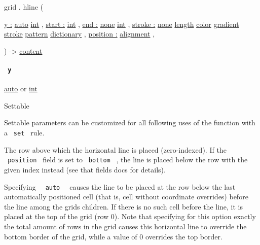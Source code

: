 grid { . } { hline } (

{ \hyperref[definitions-hline-parameters-y]{y :}
\href{/docs/reference/foundations/auto/}{auto}
\href{/docs/reference/foundations/int/}{int} , } {
\hyperref[definitions-hline-parameters-start]{start :}
\href{/docs/reference/foundations/int/}{int} , } {
\hyperref[definitions-hline-parameters-end]{end :}
\href{/docs/reference/foundations/none/}{none}
\href{/docs/reference/foundations/int/}{int} , } {
\hyperref[definitions-hline-parameters-stroke]{stroke :}
\href{/docs/reference/foundations/none/}{none}
\href{/docs/reference/layout/length/}{length}
\href{/docs/reference/visualize/color/}{color}
\href{/docs/reference/visualize/gradient/}{gradient}
\href{/docs/reference/visualize/stroke/}{stroke}
\href{/docs/reference/visualize/pattern/}{pattern}
\href{/docs/reference/foundations/dictionary/}{dictionary} , } {
\hyperref[definitions-hline-parameters-position]{position :}
\href{/docs/reference/layout/alignment/}{alignment} , }

) -\textgreater{} \href{/docs/reference/foundations/content/}{content}

\paragraph{\texorpdfstring{\texttt{\ y\ }}{ y }}\label{definitions-hline-y}

\href{/docs/reference/foundations/auto/}{auto} {or}
\href{/docs/reference/foundations/int/}{int}

{{ Settable }}

\label{definitions-hline-y-settable-tooltip}
Settable parameters can be customized for all following uses of the
function with a \texttt{\ set\ } rule.

The row above which the horizontal line is placed (zero-indexed). If the
\texttt{\ position\ } field is set to \texttt{\ bottom\ } , the line is
placed below the row with the given index instead (see that
field\textquotesingle s docs for details).

Specifying \texttt{\ }{\texttt{\ auto\ }}\texttt{\ } causes the line to
be placed at the row below the last automatically positioned cell (that
is, cell without coordinate overrides) before the line among the
grid\textquotesingle s children. If there is no such cell before the
line, it is placed at the top of the grid (row 0). Note that specifying
for this option exactly the total amount of rows in the grid causes this
horizontal line to override the bottom border of the grid, while a value
of 0 overrides the top border.

